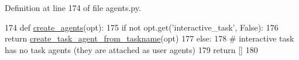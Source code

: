 Definition at line 174 of file agents.\+py.


\begin{DoxyCode}
174 \textcolor{keyword}{def }\hyperlink{namespaceparlai_1_1tasks_1_1wizard__of__wikipedia_1_1agents_a3fb02e79313f0dbce37b5120cc9add1c}{create\_agents}(opt):
175     \textcolor{keywordflow}{if} \textcolor{keywordflow}{not} opt.get(\textcolor{stringliteral}{'interactive\_task'}, \textcolor{keyword}{False}):
176         \textcolor{keywordflow}{return} \hyperlink{namespaceparlai_1_1core_1_1agents_a76269fb567532a8fb7f29edcc20a6e47}{create\_task\_agent\_from\_taskname}(opt)
177     \textcolor{keywordflow}{else}:
178         \textcolor{comment}{# interactive task has no task agents (they are attached as user agents)}
179         \textcolor{keywordflow}{return} []
180 \end{DoxyCode}
